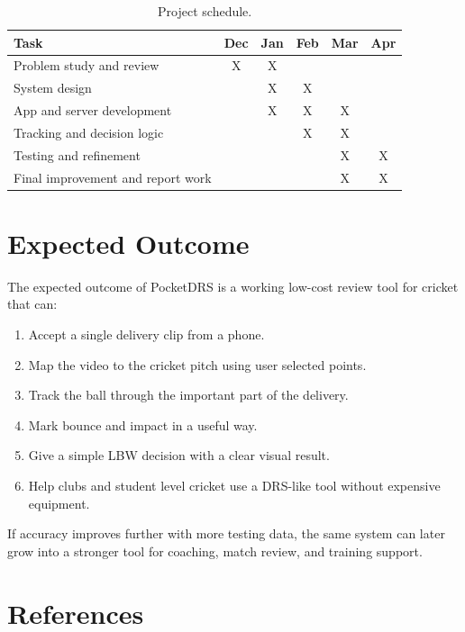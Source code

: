 \documentclass[12pt,a4paper]{article}
\begin{document}
\begin{table}[htbp]
\centering
\caption{Project schedule.}
\label{tab:gantt}
\begin{tabularx}{\textwidth}{@{}Xccccc@{}}
\toprule
\textbf{Task} & \textbf{Dec} & \textbf{Jan} & \textbf{Feb} & \textbf{Mar} & \textbf{Apr} \\
\midrule
Problem study and review & X & X &  &  &  \\
System design &  & X & X &  &  \\
App and server development &  & X & X & X &  \\
Tracking and decision logic &  &  & X & X &  \\
Testing and refinement &  &  &  & X & X \\
Final improvement and report work &  &  &  & X & X \\
\bottomrule
\end{tabularx}
\end{table}

\section{Expected Outcome}

The expected outcome of PocketDRS is a working low-cost review tool for cricket that can:

\begin{enumerate}
    \item Accept a single delivery clip from a phone.
    \item Map the video to the cricket pitch using user selected points.
    \item Track the ball through the important part of the delivery.
    \item Mark bounce and impact in a useful way.
    \item Give a simple LBW decision with a clear visual result.
    \item Help clubs and student level cricket use a DRS-like tool without expensive equipment.
\end{enumerate}

If accuracy improves further with more testing data, the same system can later grow into a stronger tool for coaching, match review, and training support.

\section{References}
\end{document}
